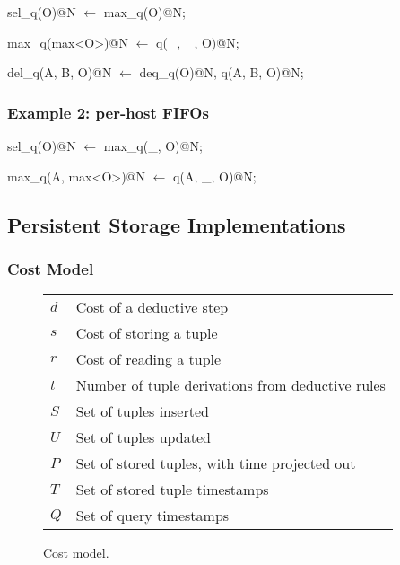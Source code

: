 \begin{Dedalus}
sel\_q(O)@N \(\leftarrow\)
  max\_q(O)@N;

max\_q(max<O>)@N \(\leftarrow\)
  q(\_, \_, O)@N;

del\_q(A, B, O)@N \(\leftarrow\)
  deq\_q(O)@N,
  q(A, B, O)@N;
\end{Dedalus}

\subsubsection{Example 2: per-host FIFOs}

\begin{Dedalus}
sel\_q(O)@N \(\leftarrow\)
  max\_q(_, O)@N; 

max\_q(A, max<O>)@N \(\leftarrow\)
  q(A, \_, O)@N;
\end{Dedalus}


\subsection{Persistent Storage Implementations}


\subsubsection{Cost Model}

\begin{figure}[t]
\begin{tabular}{ll} \hline
$d$ & Cost of a deductive step \\
$s$ & Cost of storing a tuple \\
$r$ & Cost of reading a tuple \\ 
$t$ & Number of tuple derivations from deductive rules \\ 
\hline
$S$ & Set of tuples inserted \\
$U$ & Set of tuples updated \\
$P$ & Set of stored tuples, with time projected out \\ 
$T$ & Set of stored tuple timestamps \\ 
$Q$ & Set of query timestamps \\ \hline 
\end{tabular}
\caption{Cost model.}
\label{fig:breakdown}
\end{figure}


